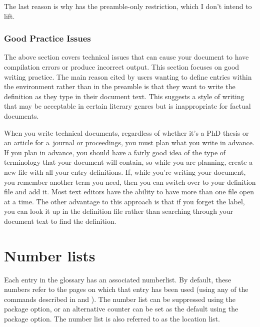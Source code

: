 \documentclass[report,inlinetitle]{nlctdoc}
\begin{document}
The last reason is why  has the
preamble-only restriction, which I don't intend to lift.

\subsection{Good Practice Issues}
\label{sec:goodpractice}

The above section covers technical issues that can cause your document to have
compilation errors or produce incorrect output. This section
focuses on good writing practice. The main reason cited by users
wanting to define entries within the  environment rather
than in the preamble is that they want to write the definition as
they type in their document text. This suggests a  style of writing that may be acceptable in certain
literary genres but is inappropriate for factual documents.

When you write technical documents, regardless of whether it's a PhD
thesis or an article for a~journal or proceedings, you must plan what you write
in advance. If you plan in advance, you should have a fairly good
idea of the type of terminology that your document will contain,
so while you are planning, create a new file with all your entry
definitions. If, while you're writing your document, you remember
another term you need, then you can switch over to your definition file and
add it. Most text editors have the ability to have more than one
file open at a time. The other advantage to this approach is that if
you forget the label, you can look it up in the definition file
rather than searching through your document text to find the
definition.

\chapter{Number lists}
\label{sec:numberlists}

Each entry in the glossary has an associated \gls{numberlist}.
By default, these numbers refer to the pages on which that entry has
been used (using any of the commands described in
 and ). The number
list can be suppressed using the  package
option, or an alternative counter can be set as the default using
the  package option. The number list is also
referred to as the location list.
\end{document}
